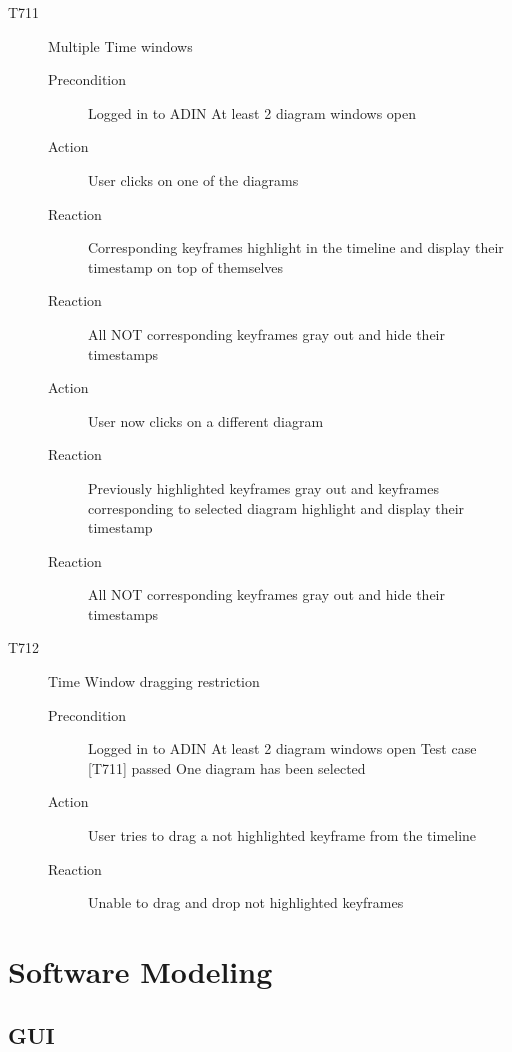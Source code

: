 \documentclass[twoside, english, draft]{Pflichtenheft}
\begin{document}
\begin{description}
  \item[T711] Multiple Time windows
\begin{description}
    \item[Precondition]
	Logged in to ADIN
	At least 2 diagram windows open
    \item[Action]
    User clicks on one of the diagrams
    \item[Reaction]
	Corresponding keyframes highlight in the timeline and display their timestamp on top of themselves
	\item[Reaction]
	All NOT corresponding keyframes gray out and hide their timestamps
	\item[Action]
	User now clicks on a different diagram
    \item[Reaction]
	Previously highlighted keyframes gray out and keyframes corresponding to selected diagram highlight and display their timestamp
	\item[Reaction]
	All NOT corresponding keyframes gray out and hide their timestamps
\end{description}

  \item[T712] Time Window dragging restriction
\begin{description}
    \item[Precondition]
	Logged in to ADIN
	At least 2 diagram windows open
	Test case [T711] passed
	One diagram has been selected
    \item[Action]
    User tries to drag a not highlighted keyframe from the timeline
    \item[Reaction]
	Unable to drag and drop not highlighted keyframes
\end{description}


\end{description}

\section{Software Modeling}



\subsection{GUI}
\end{document}
